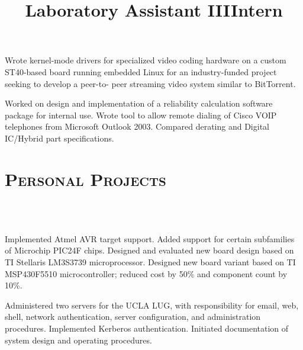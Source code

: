 \begin{resume}
\title{Laboratory Assistant III}
\begin{position}
  Wrote kernel-mode drivers for specialized video coding hardware on a
  custom ST40-based board running embedded Linux for an
  industry-funded project seeking to develop a peer-to- peer streaming
  video system similar to BitTorrent.
\end{position}

\title{Intern}
\begin{position}
  Worked on design and implementation of a reliability calculation
  software package for internal use.  Wrote tool to allow remote
  dialing of Cisco VOIP telephones from Microsoft Outlook 2003.
  Compared derating and Digital IC/Hybrid part specifications.
\end{position}

\section{\textsc{Personal Projects}}
\begin{formatb}
  \\
  \body\\
\end{formatb}

\begin{position}
  Implemented Atmel AVR target support.  Added support for certain
  subfamilies of Microchip PIC24F chips.  Designed and evaluated new
  board design based on TI Stellaris LM3S3739 microprocessor.
  Designed new board variant based on TI MSP430F5510 microcontroller;
  reduced cost by 50\% and component count by 10\%.
\end{position}

\begin{position}
  Administered two servers for the UCLA LUG, with responsibility for
  email, web, shell, network authentication, server configuration, and
  administration procedures.  Implemented Kerberos authentication.
  Initiated documentation of system design and operating procedures.
\end{position}


\end{resume}
